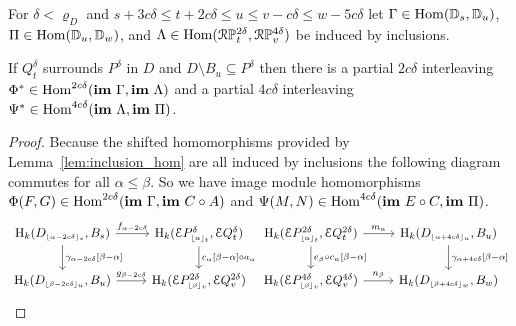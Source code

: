 \begin{lemma}\label{lem:partial_interleaving}
  For $\delta < \varrho_D$ and $s + 3c\delta\leq t + 2c\delta\leq u\leq v-c\delta\leq w-5c\delta$ let
  $\Gamma\in\mathrm{Hom}(\mathbb{D}_{s},\mathbb{D}_{u})$,
  $\Pi\in\mathrm{Hom}(\mathbb{D}_{u},\mathbb{D}_{w})$, and
  $\Lambda\in\mathrm{Hom}(\mathcal{R}\mathbb{P}_{t}^{2\delta}, \mathcal{R}\mathbb{P}_{v}^{4\delta})$ be induced by inclusions.

  If $Q_{t}^\delta$ surrounds $P^\delta$ in $D$ and $D\setminus B_u\subseteq P^\delta$ then there is a partial $2c\delta$ interleaving $\Phi^*\in\mathrm{Hom}^{2c\delta}(\mathbf{im}~\Gamma, \mathbf{im}~\Lambda)$ and a partial $4c\delta$ interleaving $\Psi^*\in\mathrm{Hom}^{4c\delta}(\mathbf{im}~\Lambda, \mathbf{im}~\Pi)$.
\end{lemma}
\begin{proof}
  Because the shifted homomorphisms provided by Lemma~\ref{lem:inclusion_hom} are all induced by inclusions the following diagram commutes for all $\alpha\leq\beta$.
  So we have image module homomorphisms $\Phi(F, G)\in\mathrm{Hom}^{2c\delta}(\mathbf{im}~\Gamma, \mathbf{im}~C\circ A)$ and $\Psi(M, N)\in\mathrm{Hom}^{4c\delta}(\mathbf{im}~E\circ C, \mathbf{im}~\Pi)$.
  \[\begin{tikzcd}
      \hom_k(D\subi{s}{\alpha-2c\delta}, B_s) \arrow{r}{f_{\alpha-2c\delta}}\arrow{d}{\gamma_{\alpha-2c\delta}[\beta-\alpha]} &
      \hom_k(\E P\subi{t}{\alpha}^\delta, \E Q_t^\delta)\arrow{d}{c_\alpha[\beta-\alpha]\circ a_\alpha}\\
      \hom_k(D\subi{u}{\beta-2c\delta}, B_u)\arrow{r}{g_{\beta-2c\delta}} &
      \hom_k(\E P\subi{v}{\beta}^{2\delta}, \E Q_v^{2\delta})
    \end{tikzcd}
    \begin{tikzcd}
      \hom_k(\E P\subi{t}{\alpha}^{2\delta}, \E Q_t^{2\delta})\arrow{d}{e_\beta\circ c_\alpha[\beta-\alpha]}\arrow{r}{m_{\alpha}} &
      \hom_k(D\subi{u}{\alpha+4c\delta}, B_u)\arrow{d}{\gamma_{\alpha+4c\delta}[\beta-\alpha]}\\
      \hom_k(\E P\subi{v}{\beta}^{4\delta}, \E Q_v^{4\delta})\arrow{r}{n_\beta} &
      \hom_k(D\subi{w}{\beta+4c\delta}, B_w)
    \end{tikzcd}\]


\end{proof}
